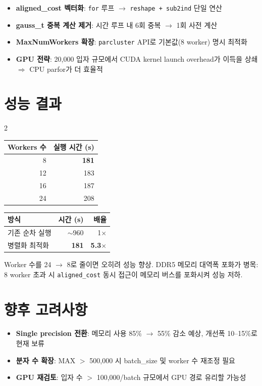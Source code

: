 \documentclass[10pt, a4paper]{article}
\begin{document}
\begin{itemize}[itemsep=1pt, topsep=1pt, leftmargin=1.2em]
  \item \textbf{aligned\_cost 벡터화}: \texttt{for} 루프 $\to$ \texttt{reshape + sub2ind} 단일 연산
  \item \textbf{gauss\_t 중복 계산 제거}: 시간 루프 내 6회 중복 $\to$ 1회 사전 계산
  \item \textbf{MaxNumWorkers 확장}: \texttt{parcluster} API로 기본값(8 worker) 명시 최적화
  \item \textbf{GPU 전략}: 20,000 입자 규모에서 CUDA kernel launch overhead가 이득을 상쇄
        $\Rightarrow$ CPU parfor가 더 효율적
\end{itemize}

\section{성능 결과}

\begin{multicols}{2}
\begin{center}
\small
\begin{tabular}{rr}
\toprule
Workers 수 & 실행 시간 (s) \\
\midrule
8  & \textbf{181} \\
12 & 183 \\
16 & 187 \\
24 & 208 \\
\bottomrule
\end{tabular}
\end{center}

\columnbreak

\begin{center}
\small
\begin{tabular}{lrr}
\toprule
방식 & 시간 (s) & 배율 \\
\midrule
기존 순차 실행 & $\sim$960 & 1$\times$ \\
병렬화 최적화 & \textbf{181} & \textbf{5.3$\times$} \\
\bottomrule
\end{tabular}
\end{center}
\end{multicols}

\smallskip
Worker 수를 24 $\to$ 8로 줄이면 오히려 성능 향상.
DDR5 메모리 대역폭 포화가 병목: 8 worker 초과 시 \texttt{aligned\_cost} 동시 접근이
메모리 버스를 포화시켜 성능 저하.

\section{향후 고려사항}

\begin{itemize}[itemsep=1pt, topsep=1pt, leftmargin=1.2em]
  \item \textbf{Single precision 전환}: 메모리 사용 85\% $\to$ 55\% 감소 예상, 개선폭 10--15\%로 현재 보류
  \item \textbf{분자 수 확장}: MAX $>$ 500,000 시 batch\_size 및 worker 수 재조정 필요
  \item \textbf{GPU 재검토}: 입자 수 $>$ 100,000/batch 규모에서 GPU 경로 유리할 가능성
\end{itemize}
\end{document}
